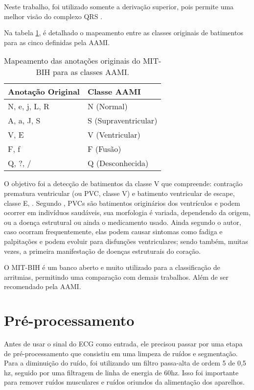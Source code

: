 Neste trabalho, foi utilizado somente a derivação superior, pois permite uma melhor visão do complexo QRS \cite{physionet_annotations}.

Na tabela \ref{tab:mapeamento_classes}, é detalhado o mapeamento entre as classes originais de batimentos para as cinco definidas pela AAMI.

\begin{table}[H]
\centering
\caption{Mapeamento das anotações originais do MIT-BIH para as classes AAMI.}
\label{tab:mapeamento_classes}
\begin{tabular}{ll}
\hline
\textbf{Anotação Original} & \textbf{Classe AAMI} \\
\hline
N, e, j, L, R & N (Normal) \\
A, a, J, S & S (Supraventricular) \\
V, E & V (Ventricular) \\
F, f & F (Fusão) \\
Q, ?, / & Q (Desconhecida) \\
\hline
\end{tabular}
\end{table}

O objetivo foi a detecção de batimentos da classe V que compreende: contração prematura ventricular (ou PVC, classe V) e batimento ventricular de escape, classe E, \cite{physionet_annotations}.
Segundo , PVCs são batimentos originários dos ventrículos e podem ocorrer em indivíduos saudáveis, sua morfologia é variada, dependendo da origem, ou a doença estrutural ou ainda o medicamento usado.
Ainda segundo o autor, caso ocorram frequentemente, elas podem causar sintomas como fadiga e palpitações e podem evoluir para
disfunções ventriculares; sendo também, muitas vezes, a primeira manifestação de doenças estruturais do coração. 

O MIT-BIH é um banco aberto e muito utilizado para a classificação de arritmias, permitindo uma comparação com demais trabalhos.
Além de ser recomendado pela AAMI.

\section{Pré-processamento}
\label{sec:pre_process}

Antes de usar o sinal do ECG como entrada, ele precisou passar por uma etapa de pré-processamento que consistiu em uma limpeza de ruídos e segmentação.
Para a diminuição do ruído, foi utilizando um filtro passa-alta de ordem 5 de 0,5 hz, seguido por uma filtragem de linha de energia de 60hz. 
Isso foi importante para remover ruídos musculares e ruídos oriundos da alimentação dos aparelhos. 

